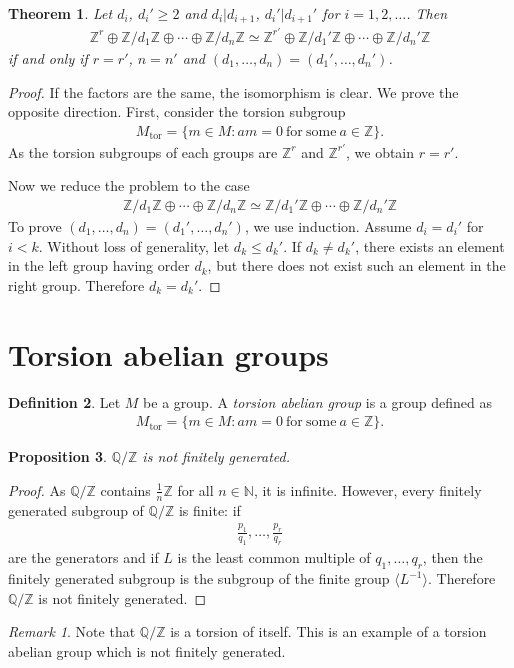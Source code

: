 \documentclass[12pt]{report}
\theoremstyle{plain}
\newtheorem{theorem}{Theorem}[section]
\newtheorem{proposition}[theorem]{Proposition}
\theoremstyle{remark}
\newtheorem*{remark}{Remark}
\theoremstyle{definition}
\newtheorem{definition}[theorem]{Definition}
\newcommand{\N}{\mathbb{N}}
\newcommand{\Z}{\mathbb{Z}}
\newcommand{\Q}{\mathbb{Q}}
\begin{document}
\begin{theorem}
    Let $d_i$, $d_i'\ge 2$ and $d_i|d_{i+1}$, $d_i'|d_{i+1}'$ for $i=1,2,\dots$. Then
    \begin{align*}
        \Z^r\oplus\Z/d_1\Z \oplus \cdots\oplus \Z/d_n\Z\simeq\Z^{r'}\oplus\Z/{d_1'}\Z \oplus \cdots\oplus \Z/d_n'\Z
    \end{align*}
    if and only if $r=r'$, $n=n'$ and $(d_1,\dots,d_n)=(d_1',\dots,d_n')$.
\end{theorem}
\begin{proof}
    If the factors are the same, the isomorphism is clear. We prove the opposite direction. First, consider the torsion subgroup
    \begin{align*}
        M_\mathrm{tor}=\{m\in M:am=0\mathrm{~for~some~}a\in \Z\}.
    \end{align*}
    As the torsion subgroups of each groups are $\Z^r$ and $\Z^{r'}$, we obtain $r=r'$.

    Now we reduce the problem to the case
    \begin{align*}
        \Z/d_1\Z \oplus \cdots\oplus \Z/d_n\Z\simeq\Z/{d_1'}\Z \oplus \cdots\oplus \Z/d_n'\Z
    \end{align*}
    To prove $(d_1,\dots,d_n)=(d_1',\dots,d_n')$, we use induction. Assume $d_i=d_i'$ for $i<k$. Without loss of generality, let $d_{k}\le d_{k}'$. If $d_k\neq d_k'$, there exists an element in the left group having order $d_k$, but there does not exist such an element in the right group. Therefore $d_k=d_k'$.
\end{proof}


\section{Torsion abelian groups}
\begin{definition}
    Let $M$ be a group. A \emph{torsion abelian group} is a group defined as
    \begin{align*}
        M_\mathrm{tor}=\{m\in M:am=0\mathrm{~for~some~}a\in \Z\}.
    \end{align*}
\end{definition}

\begin{proposition}
    $\Q/\Z$ is not finitely generated.
\end{proposition}
\begin{proof}
    As $\Q/\Z$ contains $\frac{1}{n}\Z$ for all $n\in\N$, it is infinite. However, every finitely generated subgroup of $\Q/\Z$ is finite: if
    \begin{align*}
        \frac{p_1}{q_1},\dots,\frac{p_r}{q_r}
    \end{align*}
    are the generators and if $L$ is the least common multiple of $q_1,\dots,q_r$, then the finitely generated subgroup is the subgroup of the finite group $\langle L^{-1}\rangle$. Therefore $\Q/\Z$ is not finitely generated.
\end{proof}
\begin{remark}
    Note that $\Q/\Z$ is a torsion of itself. This is an example of a torsion abelian group which is not finitely generated.
\end{remark}
\end{document}
